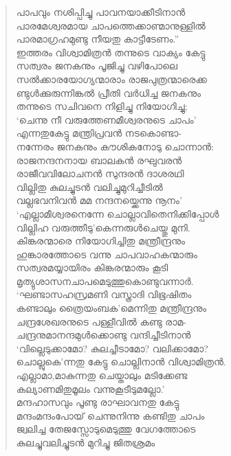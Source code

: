 \begin{verse}
പാപവും നശിപ്പിച്ചു പാവനയാക്കീടിനാന്‍\\
പാരമേശ്വരമായ ചാപത്തെക്കാണ്മാനുള്ളില്‍\\
പാരമാഗ്രഹമുണ്ടു നീയതു കാട്ടീടേണം.”\\
ഇത്തരം വിശ്വാമിത്രന്‍ തന്നുടെ വാക്യം കേട്ടു\\
സത്വരം ജനകനും പൂജിച്ചു വഴിപോലെ\\
സല്‍ക്കാരയോഗ്യന്മാരാം രാജപുത്രന്മാരെക്ക\\
ണ്ടുള്‍ക്കുരുന്നിങ്കല്‍ പ്രീതി വര്‍ധിച്ച ജനകനും\\
തന്നുടെ സചിവനെ നിളിച്ചു നിയോഗിച്ചു;\\
‘ചെന്നു നീ വരുത്തേണമീശ്വരനുടെ ചാപം’\\
എന്നതുകേട്ടു മന്ത്രിപ്രവന്‍ നടകൊണ്ടാ-\\
നന്നേരം ജനകനും കൗശികനോടു ചൊന്നാന്‍:\\
രാജനന്ദനനായ ബാലകന്‍ രഘുവരന്‍\\
രാജീവവിലോചനന്‍ സുന്ദരന്‍ ദാശരഥി\\
വില്ലിതു കുലച്ചുടന്‍ വലിച്ചുമുറിച്ചീടില്‍\\
വല്ലഭവനിവന്‍ മമ നന്ദനയ്ക്കെന്നു നൂനം’\\
‘എല്ലാമീശ്വരനെന്നേ ചൊല്ലാവിതെനിക്കിപ്പോള്‍\\
വില്ലിഹ വരുത്തീടു’കെന്നരുള്‍ചെയ്തു മുനി.\\
കിങ്കരന്മാരെ നിയോഗിച്ചിതു മന്ത്രീന്ദ്രനും\\
ഹുങ്കാരത്തോടെ വന്നു ചാപവാഹകന്മാരും\\
സത്വരമയ്യായിരം കിങ്കരന്മാരും കൂടി\\
മൃത്യുശാസനചാപമെടുത്തുകൊണ്ടുവന്നാര്‍.\\
‘ഘണ്ടാസഹസ്രമണി വസ്ത്രാദി വിഭൂഷിതം\\
കണ്ടാലും ത്രൈയംബക’മെന്നിതു മന്ത്രീന്ദ്രനും\\
ചന്ദ്രശേഖരനുടെ പള്ളീവില്‍ കണ്ടു രാമ-\\
ചന്ദ്രനുമാനന്ദമുള്‍ക്കൊണ്ടു വന്ദിച്ചീടിനാന്‍\\
‘വില്ലെടുക്കാമോ? കുലച്ചീടാമോ? വലിക്കാമോ?\\
ചൊല്ലുകെ’ന്നതു കേട്ടു ചൊല്ലിനാന്‍ വിശ്വാമിത്രന്‍.\\
എല്ലാമാ,മാകുന്നതു ചെയ്താലും മടിക്കേണ്ട\\
കല്യാണമിതുമൂലം വന്നുകൂടീടുമല്ലോ.’\\
മന്ദഹാസവും പൂണ്ടു രാഘാവനതു കേട്ടു\\
മന്ദംമന്ദംപോയ് ചെന്നുനിന്നു കണ്ടിതു ചാപം\\
ജ്വലിച്ച തേജസ്സോടുമെടുത്തു വേഗത്തോടെ\\
കുലച്ചുവലിച്ചുടന്‍ മുറിച്ചു ജിതശ്രമം\\

\end{verse}
